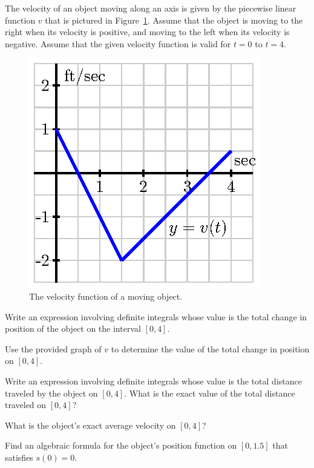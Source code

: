 \begin{exercises} 
  \item The velocity of an object moving along an axis is given by the piecewise linear function $v$ that is pictured in 
  Figure~\ref{F:4.3.Ez1}.  Assume that the object is moving to the right when its velocity is positive, and moving to the left when its velocity is negative.  Assume that the given velocity function is valid for $t = 0$ to $t = 4$.
\begin{figure}[h]
\begin{center}
\includegraphics{figures/4_3_Ez1.eps}
\caption{The velocity function of a moving object.} \label{F:4.3.Ez1}
\end{center}
\end{figure} 
	\ba
		\item Write an expression involving definite integrals whose value is the total change in position of the object on the interval $[0,4]$.
		\item Use the provided graph of $v$ to determine the value of the total change in position on $[0,4]$.
		\item Write an expression involving definite integrals whose value is the total distance traveled by the object on $[0,4]$.  What is the exact value of the total distance traveled on $[0,4]$?
		\item What is the object's exact average velocity on $[0,4]$?
		\item Find an algebraic formula for the object's position function on $[0, 1.5]$ that satisfies $s(0) = 0$.
	\ea
	

\end{exercises}
